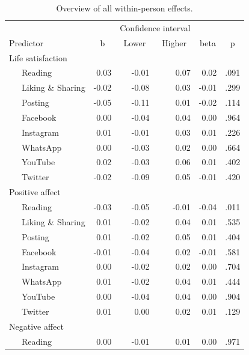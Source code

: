 \documentclass[
  man,floatsintext]{apa7}
\begin{document}
\begin{table}[tbp]

\begin{center}
\begin{threeparttable}

\caption{\label{tab:tab-within}Overview of all within-person effects.}

\footnotesize{

\begin{tabular}{lrrrrr}
\toprule
 &  & \multicolumn{2}{c}{Confidence interval}  &  &\\
\cmidrule(r){3-4}
Predictor & \multicolumn{1}{c}{b} & \multicolumn{1}{c}{Lower} & \multicolumn{1}{c}{Higher} & \multicolumn{1}{c}{beta} & \multicolumn{1}{c}{p}\\
\midrule
Life satisfaction &  &  &  &  & \\
\ \ \ Reading & 0.03 & -0.01 & 0.07 & 0.02 & .091\\
\ \ \ Liking \& Sharing & -0.02 & -0.08 & 0.03 & -0.01 & .299\\
\ \ \ Posting & -0.05 & -0.11 & 0.01 & -0.02 & .114\\
\ \ \ Facebook & 0.00 & -0.04 & 0.04 & 0.00 & .964\\
\ \ \ Instagram & 0.01 & -0.01 & 0.03 & 0.01 & .226\\
\ \ \ WhatsApp & 0.00 & -0.03 & 0.02 & 0.00 & .664\\
\ \ \ YouTube & 0.02 & -0.03 & 0.06 & 0.01 & .402\\
\ \ \ Twitter & -0.02 & -0.09 & 0.05 & -0.01 & .420\\
Positive affect &  &  &  &  & \\
\ \ \ Reading & -0.03 & -0.05 & -0.01 & -0.04 & .011\\
\ \ \ Liking \& Sharing & 0.01 & -0.02 & 0.04 & 0.01 & .535\\
\ \ \ Posting & 0.01 & -0.02 & 0.05 & 0.01 & .404\\
\ \ \ Facebook & -0.01 & -0.04 & 0.02 & -0.01 & .581\\
\ \ \ Instagram & 0.00 & -0.02 & 0.02 & 0.00 & .704\\
\ \ \ WhatsApp & 0.01 & -0.02 & 0.04 & 0.01 & .444\\
\ \ \ YouTube & 0.00 & -0.04 & 0.04 & 0.00 & .904\\
\ \ \ Twitter & 0.01 & 0.00 & 0.02 & 0.01 & .129\\
Negative affect &  &  &  &  & \\
\ \ \ Reading & 0.00 & -0.01 & 0.01 & 0.00 & .971\\

\end{tabular}}
\end{threeparttable}
\end{center}
\end{table}
\end{document}
